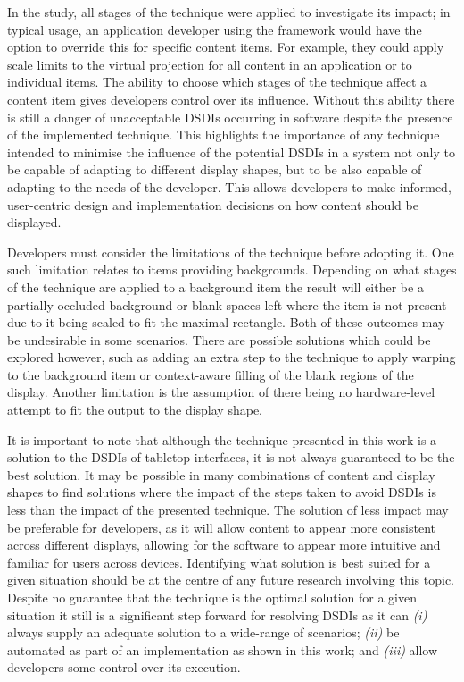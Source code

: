 \documentclass[twocolumn,compsoc]{cvm}
\begin{document}
{In the study, all stages of the technique were applied to investigate its impact; in typical usage, an application developer using the framework would have the option to override this for specific content items.
For example, they could apply scale limits to the virtual projection for all content in an application or to individual items.
The ability to choose which stages of the technique affect a content item gives developers control over its influence.
Without this ability there is still a danger of unacceptable \acp{DSDI} occurring in software despite the presence of the implemented technique.
This highlights the importance of any technique intended to minimise the influence of the potential \acp{DSDI} in a system not only to be capable of adapting to different display shapes, but to be also capable of adapting to the needs of the developer. 
This allows developers to make informed, user-centric design and implementation decisions on how content should be displayed.

Developers must consider the limitations of the technique before adopting it.
One such limitation relates to items providing backgrounds.
Depending on what stages of the technique are applied to a background item the result will either be a partially occluded background or blank spaces left where the item is not present due to it being scaled to fit the maximal rectangle.
Both of these outcomes may be undesirable in some scenarios.
There are possible solutions which could be explored however, such as adding an extra step to the technique to apply warping to the background item or context-aware filling of the blank regions of the display.
Another limitation is the assumption of there being no hardware-level attempt to fit the output to the display shape.

It is important to note that although the technique presented in this work is a solution to the \acp{DSDI} of tabletop interfaces, it is not always guaranteed to be the best solution.
It may be possible in many combinations of content and display shapes to find solutions where the impact of the steps taken to avoid \acp{DSDI} is less than the impact of the presented technique.
The solution of less impact may be preferable for developers, as it will allow content to appear more consistent across different displays, allowing for the software to appear more intuitive and familiar for users across devices.
Identifying what solution is best suited for a given situation should be at the centre of any future research involving this topic.
Despite no guarantee that the technique is the optimal solution for a given situation it still is a significant step forward for resolving \acp{DSDI} as it can {\emph{(i)}} always supply an adequate solution to a wide-range of scenarios; {\emph{(ii)}} be automated as part of an implementation as shown in this work; and {\emph{(iii)}} allow developers some control over its execution.

}
\end{document}
